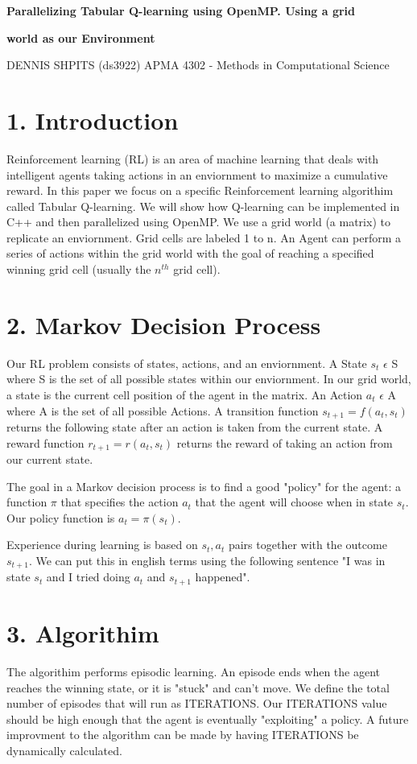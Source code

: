 \documentclass[12pt]{article}
\begin{document}
\textbf{Parallelizing Tabular Q-learning using OpenMP. Using a grid} 
\centerline{\textbf{world as our Environment}}

\centerline{DENNIS SHPITS (ds3922) APMA 4302 - Methods in Computational Science}


\section*{1. Introduction}

Reinforcement learning (RL) is an area of machine learning that deals with intelligent
agents taking actions in an enviornment to maximize a cumulative reward. In this paper 
we focus on a specific Reinforcement learning algorithim called Tabular Q-learning. 
We will show how Q-learning can be implemented in C++ and then parallelized using OpenMP. 
We use a grid world (a matrix) to replicate an enviornment. Grid cells are labeled 1 to n. 
An Agent can perform a series of actions within the grid world with the goal of reaching a specified 
winning grid cell (usually the $n^{th}$ grid cell). 

\section*{2. Markov Decision Process}

Our RL problem consists of states, actions, and an enviornment. A State $s_t$  $\epsilon$ S where S is the set of all possible states within our enviornment.
In our grid world, a state is the current cell position of the agent in the 
matrix. An Action $a_t$ $\epsilon$ A where A is the set of all possible Actions.
A transition function $s_{t+1} = f(a_t,s_t)$ returns the following state 
after an action is taken from the current state. A reward function $r_{t+1} = r(a_t,s_t)$ returns the reward of taking an
action from our current state.

The goal in a Markov decision process is to find a good "policy" for the agent: a function $\pi$ that specifies the action $a_t$ that the agent will choose when in state $s_t$. Our policy function is $a_t=\pi(s_t)$.

Experience during learning is based on $s_t,a_t$ pairs together with the outcome 
$s_{t+1}$. We can put this in english terms using the following sentence "I was in state $s_t$ and I tried doing $a_t$ and $s_{t+1}$ happened".

\section*{3. Algorithim}
The algorithim performs episodic learning. An episode ends when the agent reaches the winning state, or it is "stuck" and can't move. 
We define the total number of episodes that will run as ITERATIONS. 
Our ITERATIONS value should be high enough that the agent is eventually "exploiting"
a policy. A future improvment to the algorithm can be made by
having ITERATIONS be dynamically calculated.
\end{document}
